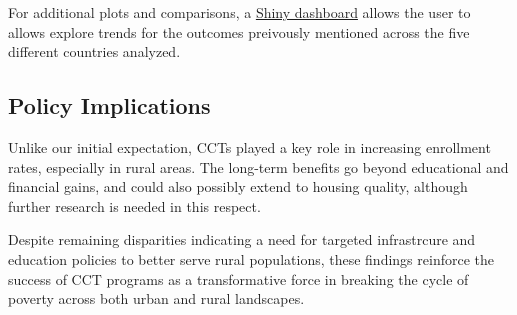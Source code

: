 \documentclass[
  10pt,
]{article}
\begin{document}
For additional plots and comparisons, a \href{./shiny-app/app.py}{Shiny
dashboard} allows the user to allows explore trends for the outcomes
preivously mentioned across the five different countries analyzed.

\subsection{Policy Implications}\label{policy-implications}

Unlike our initial expectation, CCTs played a key role in increasing
enrollment rates, especially in rural areas. The long-term benefits go
beyond educational and financial gains, and could also possibly extend
to housing quality, although further research is needed in this respect.

Despite remaining disparities indicating a need for targeted
infrastrcure and education policies to better serve rural populations,
these findings reinforce the success of CCT programs as a transformative
force in breaking the cycle of poverty across both urban and rural
landscapes.
\end{document}
